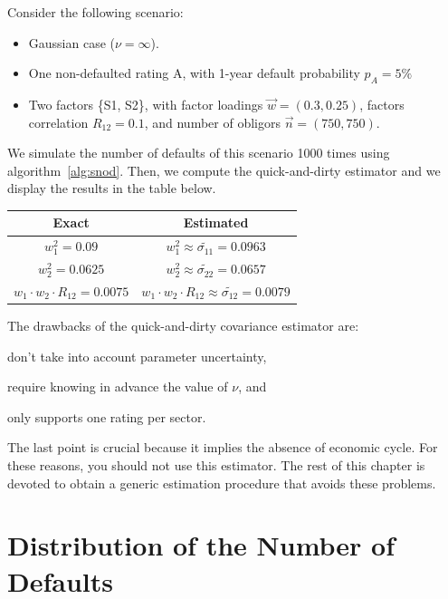 \documentclass[11pt,fleqn]{book} %
\begin{document}
\begin{example}
	Consider the following scenario:
	\begin{itemize}
		\item Gaussian case ($\nu = \infty$).
		\item One non-defaulted rating A, with 1-year default probability $p_A=5\%$
		\item Two factors \{S1, S2\}, with factor loadings $\vec{w} = (0.3, 0.25)$, 
		factors correlation $R_{12} = 0.1$, and number of obligors $\vec{n} = (750, 750)$.
	\end{itemize}
	We simulate the number of defaults of this scenario 1000 times using 
	algorithm~\ref{alg:snod}. Then, we compute the quick-and-dirty estimator 
	and we display the results in the table below.

	\hspace*{1cm}
	\begin{tabular}{|c|c|}
		\hline
		Exact & Estimated \\
		\hline
		$w_1^2 = 0.09$ & $w_1^2 \approx \widetilde{\sigma_{11}} = 0.0963$ \\
		\hline
		$w_2^2 = 0.0625$ & $w_2^2 \approx \widetilde{\sigma_{22}} = 0.0657$ \\
		\hline
		$w_1 \cdot w_2 \cdot R_{12} = 0.0075$ & $w_1 \cdot w_2 \cdot R_{12} \approx \widetilde{\sigma_{12}} = 0.0079$ \\
		\hline
	\end{tabular}
\end{example}

The drawbacks of the quick-and-dirty covariance estimator are:
\begin{inparaenum}[1)]
	\item don't take into account parameter uncertainty, 
	\item require knowing in advance the value of $\nu$, and
	\item only supports one rating per sector.
\end{inparaenum}
The last point is crucial because it implies the absence of economic cycle. 
For these reasons, you should not use this estimator. The rest of this chapter 
is devoted to obtain a generic estimation procedure that avoids these problems.

\section{Distribution of the Number of Defaults}
\end{document}
